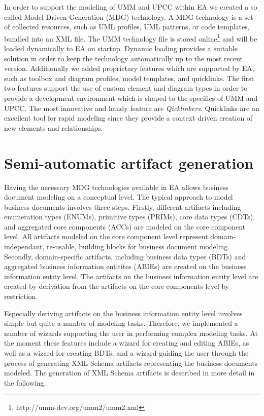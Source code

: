 \documentclass{acm_proc_article-sp}
\begin{document}
In order to support the modeling of UMM and UPCC within EA we created a so called Model Driven Generation (MDG) technology. A MDG technology is a set of collected resources, such as UML profiles, UML patterns, or code templates, bundled into an XML file. The UMM technology file is stored online\footnote{http://umm-dev.org/umm2/umm2.xml} and will be loaded dynamically to EA on startup. Dynamic loading provides a suitable solution in order to keep the technology automatically up to the most recent version. Additionally we added proprietary features which are supported by EA, such as toolbox and diagram profiles, model templates, and quicklinks. The first two features support the use of custom element and diagram types in order to provide a development environment which is shaped to the specifics of UMM and UPCC. The most innovative and handy feature are \textit{Qicklinkers}. Quicklinks are an excellent tool for rapid modeling since they provide a context driven creation of new elements and relationships. 

\section{Semi-automatic artifact generation}

Having the necessary MDG technologies available in EA allows business document modeling on a conceptual level. The typical approach to model business documents involves three steps. Firstly, different artifacts including enumeration types (ENUMs), primitive types (PRIMs), core data types (CDTs), and aggregated core components (ACCs) are modeled on the core component level. All artifacts modeled on the core component level represent domain-independant, re-usable, building blocks for business document modeling. Secondly, domain-specific artifacts, including business data types (BDTs) and aggregated business information entitites (ABIEs) are created on the business information entity level. The artifacts on the business information entity level are created by derivation from the artifacts on the core components level by restriction. 

Especially deriving artifacts on the business information entity level involves simple but quite a number of modeling tasks. Therefore, we implemented a number of wizards supporting the user in performing complex modeling tasks. At the moment these features include a wizard for creating and editing ABIEs, as well as a wizard for creating BDTs, and a wizard guiding the user through the process of generating XML Schema artifacts representing the business documents modeled. The generation of XML Schema artifacts is described in more detail in the following. 
\end{document}
